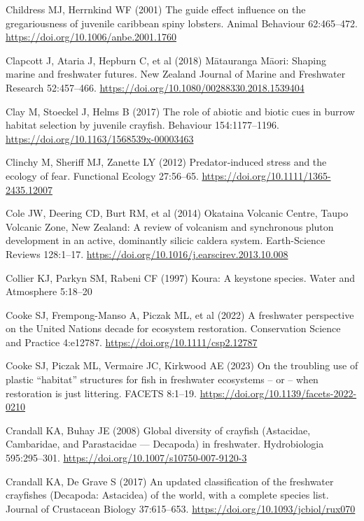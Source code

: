 \documentclass[
  12pt,
  a4paper,
]{scrbook}
\newlength{\cslhangindent}
\newenvironment{CSLReferences}[2] %
 {\begin{list}{}{%
  \setlength{\itemindent}{0pt}
  \setlength{\leftmargin}{0pt}
  \setlength{\parsep}{0pt}
  \ifodd #1
   \setlength{\leftmargin}{\cslhangindent}
   \setlength{\itemindent}{-1\cslhangindent}
  \fi
  \setlength{\itemsep}{#2\baselineskip}}}
 {\end{list}}
\begin{document}
\begin{CSLReferences}{1}{1}
Childress MJ, Herrnkind WF (2001) The guide effect influence on the
gregariousness of juvenile caribbean spiny lobsters. Animal Behaviour
62:465--472. \url{https://doi.org/10.1006/anbe.2001.1760}

Clapcott J, Ataria J, Hepburn C, et al (2018) {Mātauranga Māori}:
Shaping marine and freshwater futures. New Zealand Journal of Marine and
Freshwater Research 52:457--466.
\url{https://doi.org/10.1080/00288330.2018.1539404}

Clay M, Stoeckel J, Helms B (2017) The role of abiotic and biotic cues
in burrow habitat selection by juvenile crayfish. Behaviour
154:1177--1196. \url{https://doi.org/10.1163/1568539x-00003463}

Clinchy M, Sheriff MJ, Zanette LY (2012) Predator‐induced stress and the
ecology of fear. Functional Ecology 27:56--65.
\url{https://doi.org/10.1111/1365-2435.12007}

Cole JW, Deering CD, Burt RM, et al (2014) {Okataina Volcanic Centre,
Taupo Volcanic Zone, New Zealand}: A review of volcanism and synchronous
pluton development in an active, dominantly silicic caldera system.
Earth-Science Reviews 128:1--17.
\url{https://doi.org/10.1016/j.earscirev.2013.10.008}

Collier KJ, Parkyn SM, Rabeni CF (1997) Koura: A keystone species. Water
and Atmosphere 5:18--20

Cooke SJ, Frempong-Manso A, Piczak ML, et al (2022) A freshwater
perspective on the {United Nations} decade for ecosystem restoration.
Conservation Science and Practice 4:e12787.
\url{https://doi.org/10.1111/csp2.12787}

Cooke SJ, Piczak ML, Vermaire JC, Kirkwood AE (2023) On the troubling
use of plastic {``habitat''} structures for fish in freshwater
ecosystems -- or -- when restoration is just littering. FACETS 8:1--19.
\url{https://doi.org/10.1139/facets-2022-0210}

Crandall KA, Buhay JE (2008) Global diversity of crayfish ({Astacidae,
Cambaridae}, and {Parastacidae} --- {Decapoda}) in freshwater.
Hydrobiologia 595:295--301.
\url{https://doi.org/10.1007/s10750-007-9120-3}

Crandall KA, De Grave S (2017) An updated classification of the
freshwater crayfishes ({Decapoda: Astacidea}) of the world, with a
complete species list. Journal of Crustacean Biology 37:615--653.
\url{https://doi.org/10.1093/jcbiol/rux070}


\end{CSLReferences}
\end{document}

